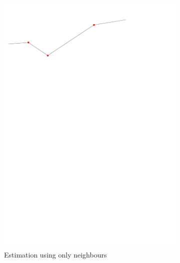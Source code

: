\begin{figure}[tbh]
\begin{subfigure}[b]{0.45\linewidth}
    \includegraphics[width=\textwidth,page=2]{figs/1Dsmoothop.pdf}
    \caption{Estimation using only neighbours}\label{fig:1Dsmoothop:b}
  \end{subfigure}
  \quad
  \begin{subfigure}[b]{0.45\linewidth}
    \centering

\end{subfigure}
\end{figure}
